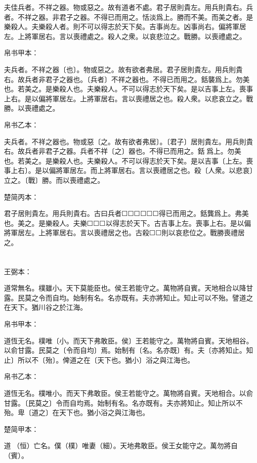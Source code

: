 \documentclass[a5paper]{ctexbook}
\begin{document}
    夫佳兵者。不祥之器。物或惡之。故有道者不處。君子居則貴左。用兵則貴右。兵者。不祥之器。非君子之器。不得已而用之。恬淡爲上。勝而不美。而美之者。是樂殺人。夫樂殺人者。則不可以得志於天下矣。吉事尚左。凶事尚右。偏將軍居左。上將軍居右。言以喪禮處之。殺人之衆。以哀悲泣之。戰勝。以喪禮處之。

    
    帛书甲本：

    夫兵者。不祥之器〔也〕。物或惡之。故有欲者弗居。君子居則貴左。用兵則貴右。故兵者非君子之器也。〔兵者〕不祥之器也。不得已而用之。銛襲爲上。勿美也。若美之。是樂殺人也。夫樂殺人。不可以得志於天下矣。是以吉事上左。喪事上右。是以偏將軍居左。上將軍居右。言以喪禮居之也。殺人衆。以悲哀立之。戰勝。以喪禮處之。

    帛书乙本：

    夫兵者。不祥之器也。物或惡〔之。故有欲者弗居〕。〔君子〕居則貴左。用兵則貴右。故兵者非君子之器。兵者不祥〔之〕器也。不得已而用之。銛𢤱爲上。勿美也。若美之。是樂殺人也。夫樂殺人。不可以得志於天下矣。是以吉事〔上左。喪事上右〕。是以偏將軍居左。而上將軍居右。言以喪禮居之也。殺〔人衆。以悲哀〕立之。〔戰〕勝。而以喪禮處之。

    楚简丙本：

    君子居則貴左。用兵則貴右。古曰兵者☐☐☐☐☐☐得已而用之。銛龔爲上。弗美也。美之。是樂殺人。夫樂☐☐☐以得志於天下。古吉事上左。喪事上右。是以偏將軍居左。上將軍居右。言以喪禮居之也。古殺☐☐則以哀悲位之。戰勝喪禮居之。

    \chapter{}
    王弼本：

    道常無名。樸雖小。天下莫能臣也。侯王若能守之。萬物將自賓。天地相合以降甘露。民莫之令而自均。始制有名。名亦既有。夫亦將知止。知止可以不殆。譬道之在天下。猶川谷之於江海。

    
    帛书甲本：

    道恆无名。樸唯〔小。而天下弗敢臣。侯〕王若能守之。萬物將自賓。天地相谷。以俞甘露。民莫之〔令而自均〕焉。始制有〔名。名亦既〕有。夫〔亦將知止。知止〕所以不〔殆〕。俾道之在〔天下也。猶小〕浴之與江海也。

    帛书乙本：

    道恆无名。樸唯小。而天下弗敢臣。侯王若能守之。萬物將自賓。天地相合。以俞甘露。〔民莫之〕令而自均焉。始制有名。名亦既有。夫亦將知止。知止所以不殆。卑〔道之〕在天下也。猶小浴之與江海也。

    楚简甲本：

    道𠄨（恒）亡名。僕（樸）唯妻（細）。天地弗敢臣。侯王女能守之。萬勿將自󵦐（賓）。
\end{document}
